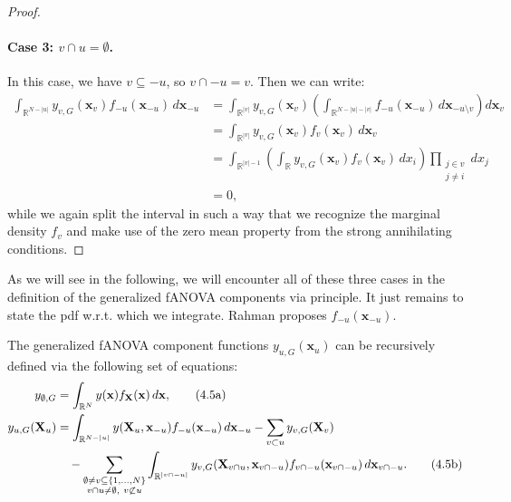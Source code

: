 \begin{proof}
\paragraph{Case 3: \( v \cap u = \emptyset \).}
In this case, we have \( v \subseteq -u \), so \( v \cap -u = v \). Then we can write:
\[
\begin{aligned}
\int_{\mathbb{R}^{N - |u|}} y_{v,G}(\mathbf{x}_v) f_{-u}(\mathbf{x}_{-u}) \, d\mathbf{x}_{-u}
&= \int_{\mathbb{R}^{|v|}} y_{v,G}(\mathbf{x}_v)
\left( \int_{\mathbb{R}^{N - |u| - |v|}} f_{-u}(\mathbf{x}_{-u}) \, d\mathbf{x}_{-u \setminus v} \right)
d\mathbf{x}_v \\
&= \int_{\mathbb{R}^{|v|}} y_{v,G}(\mathbf{x}_v) f_v(\mathbf{x}_v) \, d\mathbf{x}_v \\
&= \int_{\mathbb{R}^{|v|-1}} \left( \int_{\mathbb{R}} y_{v,G}(\mathbf{x}_v) f_v(\mathbf{x}_v) \, dx_i \right)
\prod_{\substack{j \in v \\ j \ne i}} dx_j \\
&= 0,
\end{aligned}
\]
while we again split the interval in such a way that we recognize the marginal density $f_v$ and make use of the zero mean property from the strong annihilating conditions.

\end{proof}

As we will see in the following, we will encounter all of these three cases in the definition of the generalized fANOVA components via \cite{rahman2014} principle. It just remains to state the pdf w.r.t. which we integrate. Rahman proposes $f_{-u}(\boldsymbol{x}_{-u})$.
\begin{theorem}
The generalized fANOVA component functions \( y_{u,G}(\mathbf{x}_u) \) can be recursively defined via the following set of equations:
\begin{align}
y_{\emptyset,G} &= \int_{\mathbb{R}^N} y(\mathbf{x}) f_{\mathbf{X}}(\mathbf{x}) \, d\mathbf{x}, \tag{4.5a} \\
y_{u,G}(\mathbf{X}_u) &= \int_{\mathbb{R}^{N - |u|}} y(\mathbf{X}_u, \mathbf{x}_{-u}) f_{-u}(\mathbf{x}_{-u}) \, d\mathbf{x}_{-u}
- \sum_{v \subset u} y_{v,G}(\mathbf{X}_v) \notag \\
&\quad - \sum_{\substack{\emptyset \ne v \subseteq \{1,\dots,N\} \\ v \cap u \ne \emptyset,\ v \not\subset u}} 
\int_{\mathbb{R}^{|v \cap -u|}} y_{v,G}(\mathbf{X}_{v \cap u}, \mathbf{x}_{v \cap -u}) f_{v \cap -u}(\mathbf{x}_{v \cap -u}) \, d\mathbf{x}_{v \cap -u}. \tag{4.5b}
\end{align}
\end{theorem}



